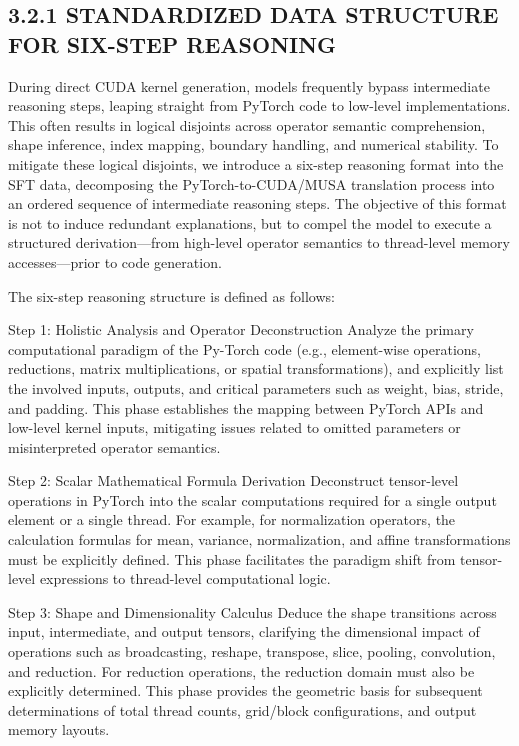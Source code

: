 \documentclass[
  10
]{article}
\begin{document}
\subsection{3.2.1 STANDARDIZED DATA STRUCTURE FOR SIX-STEP
REASONING}\label{standardized-data-structure-for-six-step-reasoning}

During direct CUDA kernel generation, models frequently bypass
intermediate reasoning steps, leaping straight from PyTorch code to
low-level implementations. This often results in logical disjoints
across operator semantic comprehension, shape inference, index mapping,
boundary handling, and numerical stability. To mitigate these logical
disjoints, we introduce a six-step reasoning format into the SFT data,
decomposing the PyTorch-to-CUDA/MUSA translation process into an ordered
sequence of intermediate reasoning steps. The objective of this format
is not to induce redundant explanations, but to compel the model to
execute a structured derivation---from high-level operator semantics to
thread-level memory accesses---prior to code generation.

The six-step reasoning structure is defined as follows:

Step 1: Holistic Analysis and Operator Deconstruction Analyze the
primary computational paradigm of the Py-Torch code (e.g., element-wise
operations, reductions, matrix multiplications, or spatial
transformations), and explicitly list the involved inputs, outputs, and
critical parameters such as weight, bias, stride, and padding. This
phase establishes the mapping between PyTorch APIs and low-level kernel
inputs, mitigating issues related to omitted parameters or
misinterpreted operator semantics.

Step 2: Scalar Mathematical Formula Derivation Deconstruct tensor-level
operations in PyTorch into the scalar computations required for a single
output element or a single thread. For example, for normalization
operators, the calculation formulas for mean, variance, normalization,
and affine transformations must be explicitly defined. This phase
facilitates the paradigm shift from tensor-level expressions to
thread-level computational logic.

Step 3: Shape and Dimensionality Calculus Deduce the shape transitions
across input, intermediate, and output tensors, clarifying the
dimensional impact of operations such as broadcasting, reshape,
transpose, slice, pooling, convolution, and reduction. For reduction
operations, the reduction domain must also be explicitly determined.
This phase provides the geometric basis for subsequent determinations of
total thread counts, grid/block configurations, and output memory
layouts.
\end{document}
